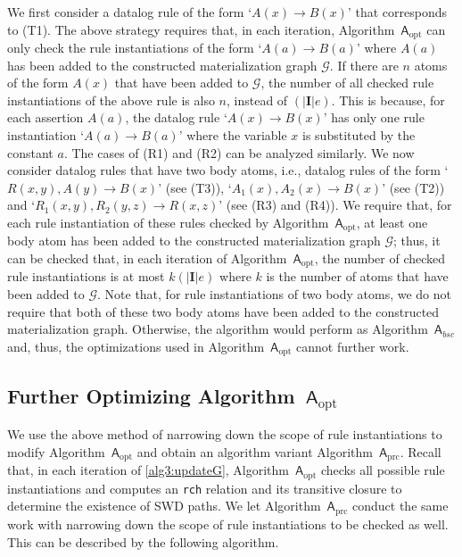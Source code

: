 We first consider a datalog rule of the
form `$A(x)\rightarrow B(x)$' that corresponds to (T1). The above strategy requires that,
in each iteration, Algorithm~$\mathsf{A}_{\text{opt}}$ can only check the rule instantiations
of the form `$A(a)\rightarrow B(a)$' where $A(a)$ has been added to the constructed materialization
graph $\mathcal{G}$. If there are $n$ atoms of the form $A(x)$ that have been added to $\mathcal{G}$,
the number of all checked rule instantiations of the above rule is also $n$, instead of $(|\textbf{I}|e)$.
This is because, for each assertion $A(a)$,
the datalog rule `$A(x)\rightarrow B(x)$'
has only one rule instantiation `$A(a)\rightarrow B(a)$' where
the variable $x$ is substituted by the constant $a$.
The cases of (R1) and (R2) can be analyzed similarly.
We now consider datalog rules that have two body atoms, i.e.,
datalog rules of the form `$R(x,y),A(y)\rightarrow B(x)$' (see (T3)),
`$A_1(x),A_2(x)\rightarrow B(x)$' (see (T2)) and `$R_1(x,y),R_2(y,z)\rightarrow R(x,z)$' (see (R3) and (R4)).
We require that, for each rule instantiation of these rules checked by Algorithm~$\mathsf{A}_{\text{opt}}$,
at least one body atom has been added to the constructed materialization
graph $\mathcal{G}$; thus, it can be checked that, in each iteration of Algorithm~$\mathsf{A}_{\text{opt}}$,
the number of checked rule instantiations
is at most $k(|\textbf{I}|e)$ where $k$ is the number of atoms that have been
added to $\mathcal{G}$.
Note that, for rule instantiations of two body atoms,
we do not require that both of these two body atoms have been added to
the constructed materialization graph.
Otherwise, the algorithm would
perform as Algorithm~$\mathsf{A}_{bsc}$ and, thus, the
optimizations used in Algorithm~$\mathsf{A}_{\text{opt}}$ cannot further work.



\subsection{Further Optimizing Algorithm~$\mathsf{A}_{\text{opt}}$}


We use the above method of narrowing down the scope of rule instantiations to
modify Algorithm~$\mathsf{A}_{\text{opt}}$ and obtain an algorithm variant Algorithm~$\mathsf{A}_{\text{prc}}$.
Recall that,
in each iteration of \ref{alg3:updateG}, Algorithm~$\mathsf{A}_{\text{opt}}$
checks all possible rule instantiations and computes an \texttt{rch} relation
and its transitive closure to determine the existence of SWD paths.
We let Algorithm~$\mathsf{A}_{\text{prc}}$ conduct the same work with
narrowing down the scope of rule instantiations to be checked as well. This can be described
by the following algorithm.\\

